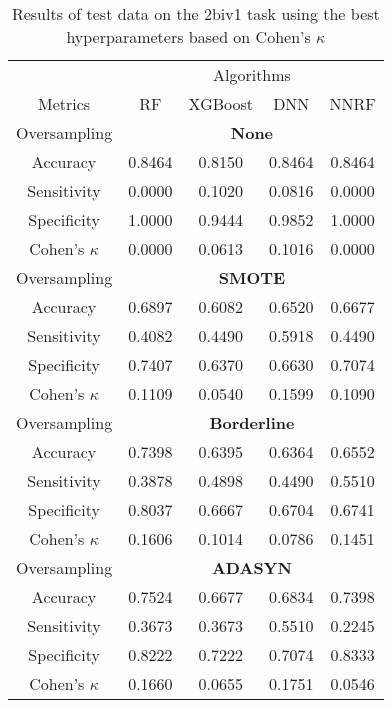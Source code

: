 \begin{table}[!htb]
\centering
\caption{Results of test data on the 2biv1 task using the best hyperparameters based on Cohen's $\kappa$}
\label{tab:2biv1_test_results}
\begin{tabular}{c | c c c c}
\hline
 & \multicolumn{4}{c}{Algorithms}\\ 
Metrics &RF & XGBoost & DNN & NNRF\\ 
\hline
Oversampling &\multicolumn{4}{|c}{\textbf{None}}\\ 
\hline
Accuracy & 0.8464 & 0.8150 & 0.8464 & 0.8464\\ 
Sensitivity & 0.0000 & 0.1020 & 0.0816 & 0.0000\\ 
Specificity & 1.0000 & 0.9444 & 0.9852 & 1.0000\\ 
Cohen's $\kappa$ & 0.0000 & 0.0613 & 0.1016 & 0.0000\\ 
\hline
Oversampling &\multicolumn{4}{|c}{\textbf{SMOTE}}\\ 
\hline
Accuracy & 0.6897 & 0.6082 & 0.6520 & 0.6677\\ 
Sensitivity & 0.4082 & 0.4490 & 0.5918 & 0.4490\\ 
Specificity & 0.7407 & 0.6370 & 0.6630 & 0.7074\\ 
Cohen's $\kappa$ & 0.1109 & 0.0540 & 0.1599 & 0.1090\\ 
\hline
Oversampling &\multicolumn{4}{|c}{\textbf{Borderline}}\\ 
\hline
Accuracy & 0.7398 & 0.6395 & 0.6364 & 0.6552\\ 
Sensitivity & 0.3878 & 0.4898 & 0.4490 & 0.5510\\ 
Specificity & 0.8037 & 0.6667 & 0.6704 & 0.6741\\ 
Cohen's $\kappa$ & 0.1606 & 0.1014 & 0.0786 & 0.1451\\ 
\hline
Oversampling &\multicolumn{4}{|c}{\textbf{ADASYN}}\\ 
\hline
Accuracy & 0.7524 & 0.6677 & 0.6834 & 0.7398\\ 
Sensitivity & 0.3673 & 0.3673 & 0.5510 & 0.2245\\ 
Specificity & 0.8222 & 0.7222 & 0.7074 & 0.8333\\ 
Cohen's $\kappa$ & 0.1660 & 0.0655 & 0.1751 & 0.0546\\ 
\hline
\end{tabular}
\end{table}


